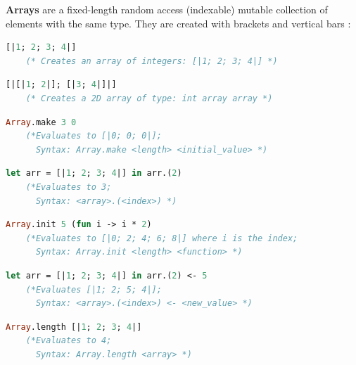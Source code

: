 \vfill

\begin{Def}

    \textbf{Arrays} are a fixed-length random access (indexable) mutable collection of elements with the same type.
    They are created with brackets and vertical bars \snippet{[| |]}:
    \begin{lstlisting}[language=OCaml, caption={Defining and Modifying an Array}, numbers=none]
    [|1; 2; 3; 4|]
    (* Creates an array of integers: [|1; 2; 3; 4|] *)
    \end{lstlisting}

    \begin{lstlisting}[language=OCaml, caption={2D Array}, numbers=none]
    [|[|1; 2|]; [|3; 4|]|]
    (* Creates a 2D array of type: int array array *)    
    \end{lstlisting}

    \begin{lstlisting}[language=OCaml, caption={Arrays.make: Prefill Length Array}, numbers=none]
    Array.make 3 0
    (*Evaluates to [|0; 0; 0|]; 
      Syntax: Array.make <length> <initial_value> *)
    \end{lstlisting}

    \begin{lstlisting}[language=OCaml, caption={Accessing Array Elements}, numbers=none]
    let arr = [|1; 2; 3; 4|] in arr.(2)
    (*Evaluates to 3; 
      Syntax: <array>.(<index>) *)
    \end{lstlisting}

    \begin{lstlisting}[language=OCaml, caption={Arrays.init: Creating Array with Function}, numbers=none]
    Array.init 5 (fun i -> i * 2)
    (*Evaluates to [|0; 2; 4; 6; 8|] where i is the index; 
      Syntax: Array.init <length> <function> *)
    \end{lstlisting}

    \begin{lstlisting}[language=OCaml, caption={Mutating Array Elements}, numbers=none]
    let arr = [|1; 2; 3; 4|] in arr.(2) <- 5
    (*Evaluates [|1; 2; 5; 4|]; 
      Syntax: <array>.(<index>) <- <new_value> *)
    \end{lstlisting}

    \begin{lstlisting}[language=OCaml, caption={Length of Array}, numbers=none]
    Array.length [|1; 2; 3; 4|]
    (*Evaluates to 4; 
      Syntax: Array.length <array> *)
    \end{lstlisting}
\end{Def}

